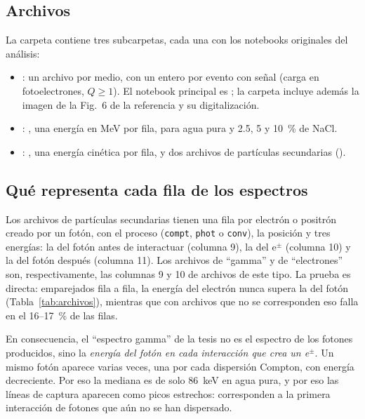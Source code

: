 \documentclass[11pt,a4paper]{article}
\newcommand{\var}[1]{\texttt{#1}}
\begin{document}
\subsection{Archivos}

La carpeta contiene tres subcarpetas, cada una con los notebooks originales del análisis:
\begin{itemize}
  \item {}: un archivo  por medio, con un entero por evento con señal (carga en fotoelectrones, $Q\geq1$). El notebook principal es ; la carpeta incluye además la imagen de la Fig.~6 de la referencia y su digitalización.
  \item {}: , una energía en MeV por fila, para agua pura y 2.5, 5 y 10~\% de NaCl.
  \item {}: , una energía cinética por fila, y dos archivos de partículas secundarias ().
\end{itemize}

\subsection{Qué representa cada fila de los espectros}

Los archivos de partículas secundarias tienen una fila por electrón o positrón creado por un fotón, con el proceso (\var{compt}, \var{phot} o \var{conv}), la posición y tres energías: la del fotón antes de interactuar (columna 9), la del e$^\pm$ (columna 10) y la del fotón después (columna 11). Los archivos de ``gamma'' y de ``electrones'' son, respectivamente, las columnas 9 y 10 de archivos de este tipo. La prueba es directa: emparejados fila a fila, la energía del electrón nunca supera la del fotón (Tabla~\ref{tab:archivos}), mientras que con archivos que no se corresponden eso falla en el 16--17~\% de las filas.

En consecuencia, el ``espectro gamma'' de la tesis no es el espectro de los fotones producidos, sino la \emph{energía del fotón en cada interacción que crea un e$^\pm$}. Un mismo fotón aparece varias veces, una por cada dispersión Compton, con energía decreciente. Por eso la mediana es de solo 86~keV en agua pura, y por eso las líneas de captura aparecen como picos estrechos: corresponden a la primera interacción de fotones que aún no se han dispersado.
\end{document}
